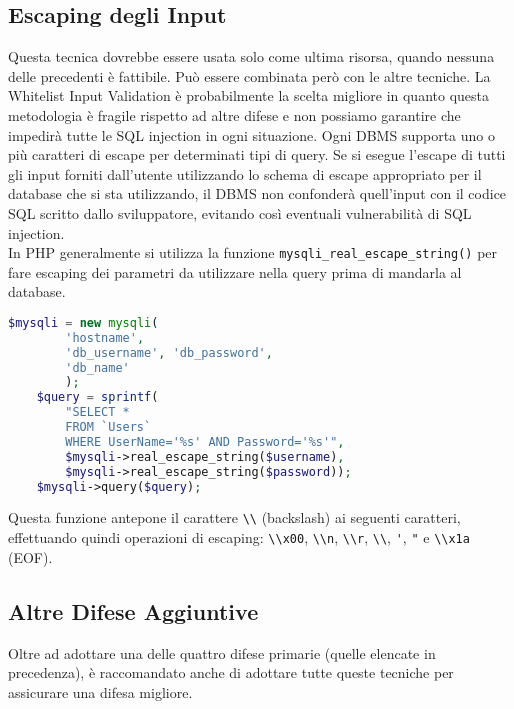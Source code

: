 \subsection{Escaping degli Input}

Questa tecnica dovrebbe essere usata solo come ultima risorsa,
quando nessuna delle
precedenti è fattibile. Può essere combinata però con le altre tecniche.
La Whitelist Input Validation è probabilmente la scelta migliore
in quanto questa
metodologia è fragile rispetto ad altre difese e non possiamo garantire che
impedirà tutte le
SQL injection in ogni situazione.
Ogni DBMS supporta uno o più caratteri di escape per determinati tipi di query.
Se si esegue
l'escape di tutti gli input forniti dall'utente utilizzando lo schema di escape
appropriato per il
database che si sta utilizzando, il DBMS non confonderà quell'input con il codice
SQL scritto
dallo sviluppatore, evitando così eventuali vulnerabilità di SQL injection.\\

In PHP generalmente si utilizza la funzione \verb|mysqli_real_escape_string()|
per fare escaping dei parametri da utilizzare nella query prima di mandarla
al database.

\begin{lstlisting}[language=Php]
    $mysqli = new mysqli(
        'hostname', 
        'db_username', 'db_password', 
        'db_name'
        );
    $query = sprintf(
        "SELECT * 
        FROM `Users` 
        WHERE UserName='%s' AND Password='%s'", 
        $mysqli->real_escape_string($username), 
        $mysqli->real_escape_string($password));
    $mysqli->query($query);
\end{lstlisting}

Questa funzione antepone il carattere \verb|\\| (backslash) ai seguenti caratteri,
effettuando quindi operazioni di escaping: \verb|\\x00|, \verb|\\n|, \verb|\\r|,
\verb|\\|, \verb|'|, \verb|"| e \verb|\\x1a| (EOF).

\subsection{Altre Difese Aggiuntive}

Oltre ad adottare una delle quattro difese primarie (quelle elencate in precedenza),
è raccomandato anche di adottare tutte
queste tecniche per assicurare una difesa migliore.

